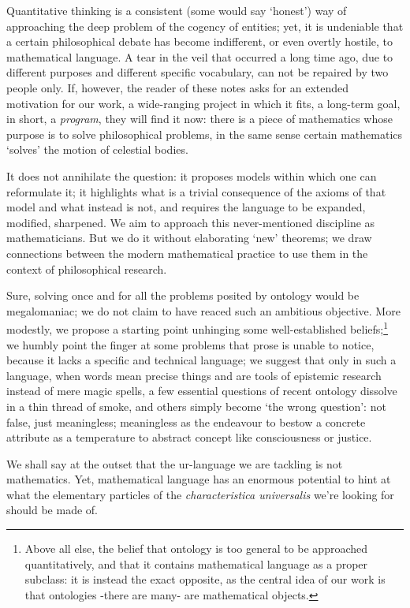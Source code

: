 Quantitative thinking is a consistent (some would say `honest') way of approaching the deep problem of the cogency of entities; yet, it is undeniable that a certain philosophical debate has become indifferent, or even overtly hostile, to mathematical language. A tear in the veil that occurred a long time ago, due to different purposes and different specific vocabulary, can not be repaired by two people only. If, however, the reader of these notes asks for an extended motivation for our work, a wide-ranging project in which it fits, a long-term goal, in short, a \emph{program}, they will find it now: there is a piece of mathematics whose purpose is to solve philosophical problems, in the same sense certain mathematics `solves' the motion of celestial bodies.

It does not annihilate the question: it proposes models within which one can reformulate it; it highlights what is a trivial consequence of the axioms of that model and what instead is not, and requires the language to be expanded, modified, sharpened. We aim to approach this never-mentioned discipline as mathematicians. But we do it without elaborating `new' theorems; we draw connections between the modern mathematical practice to use them in the context of philosophical research.

Sure, solving once and for all the problems posited by ontology would be megalomaniac; we do not claim to have reaced such an ambitious objective. More modestly, we propose a starting point unhinging some well-established beliefs;\footnote{Above all else, the belief that ontology is too general to be approached quantitatively, and that it contains mathematical language as a proper subclass: it is instead the exact opposite, as the central idea of our work is that ontologies -there are many- are mathematical objects.} we humbly point the finger at some problems that prose is unable to notice, because it lacks a specific and technical language; we suggest that only in such a language, when words mean precise things and are tools of epistemic research instead of mere magic spells, a few essential questions of recent ontology dissolve in a thin thread of smoke, and others simply become `the wrong question': not false, just meaningless; meaningless as the endeavour to bestow a concrete attribute as a temperature to abstract concept like consciousness or justice.

We shall say at the outset that the ur-language we are tackling is not mathematics. Yet, mathematical language has an enormous potential to hint at what the elementary particles of the \emph{characteristica universalis} we're looking for should be made of.

